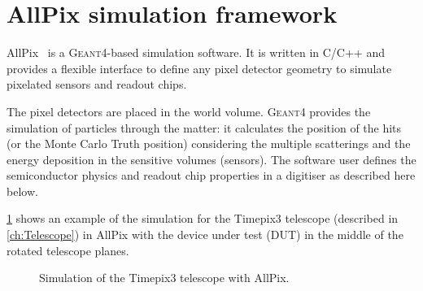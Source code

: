 \section{AllPix simulation framework}
\label{sec:AllPix}

AllPix~\cite{allpix} is a \textsc{Geant4}-based simulation
software. It is written in C/C++ and provides a flexible interface to
define any pixel detector geometry to simulate pixelated sensors and
readout chips.

The pixel detectors are placed in the world volume. \textsc{Geant4}
provides the simulation of particles through the matter: it calculates
the position of the hits (or the Monte Carlo Truth position)
considering the multiple scatterings and the energy deposition in the
sensitive volumes (sensors). The software user defines the
semiconductor physics and readout chip properties in a digitiser as
described here below.

\cref{fig:TPX3TelescopeAllpix} shows an example of the simulation for
the Timepix3 telescope (described in \cref{ch:Telescope}) in AllPix
with the device under test (DUT) in the middle of the rotated telescope
planes.

\begin{figure}[htbp]
  \centering
  \caption{Simulation of the Timepix3 telescope with AllPix.}
  \label{fig:TPX3TelescopeAllpix}
\end{figure}

